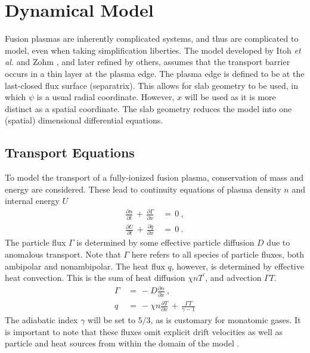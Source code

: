 \chapter{Dynamical Model}\label{chapter:dynamical_model}
Fusion plasmas are inherently complicated systems, and thus are complicated to model, even when taking simplification liberties.
The model developed by Itoh \emph{et al.} \cite{itoh_edge_1991} and Zohm \cite{zohm_dynamic_1994}, and later refined by others, assumes that the transport barrier occurs in a thin layer at the plasma edge.
The plasma edge is defined to be at the last-closed flux surface (separatrix).
This allows for slab geometry to be used, in which $\psi$ is a usual radial coordinate.
However, $x$ will be used as it is more distinct as a spatial coordinate.
The slab geometry reduces the model into one (spatial) dimensional differential equations.

\section{Transport Equations}\label{sec:transport_eqs}
To model the transport of a fully-ionized fusion plasma, conservation of mass and energy are considered.
These lead to continuity equations of plasma density $n$ and internal energy $U$
\begin{align} %
	\frac{\partial n}{\partial t} \,+\, \frac{\partial \Gamma}{\partial x} \,&=\, 0~,\label{eq:n_continuity} \\
	\frac{\partial U}{\partial t} \,+\, \frac{\partial q}{\partial x} \,&=\, 0\label{eq:U_continuity}~.
\end{align}
The particle flux $\Gamma$ is determined by some effective particle diffusion $D$ due to anomalous transport.
Note that $\Gamma$ here refers to all species of particle fluxes, both ambipolar and nonambipolar.
The heat flux $q$, however, is determined by effective heat convection.
This is the sum of heat diffusion $\chi n T^\prime$, and advection $\Gamma T$.
\begin{align} %
	\Gamma \,&=\, -D \frac{\partial n}{\partial x}~,\label{eq:particle_flux} \\
	q \,&=\, -\chi n \frac{\partial T}{\partial x} \,+\, \frac{\Gamma T}{\gamma - 1} \label{eq:heat_flux}
\end{align}
The adiabatic index $\gamma$ will be set to $5/3$, as is customary for monatomic gases.
It is important to note that these fluxes omit explicit drift velocities as well as particle and heat sources from within the domain of the model \cite{zohm_dynamic_1994}.

